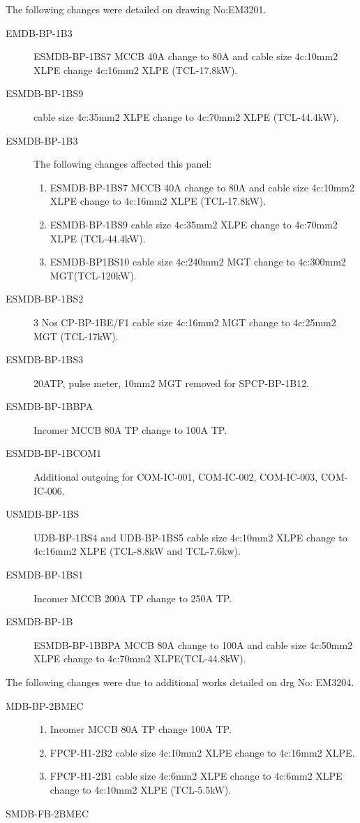 The following changes were detailed on drawing No:EM3201.

\begin{description}
\item[EMDB-BP-1B3] ESMDB-BP-1BS7 MCCB 40A change to 80A and cable size 4c:10mm2 XLPE change 4c:16mm2 XLPE (TCL-17.8kW).
\item[ESMDB-BP-1BS9] cable size 4c:35mm2 XLPE change to 4c:70mm2 XLPE (TCL-44.4kW).
\item[ESMDB-BP-1B3]  The following changes affected this panel:
     \begin{enumerate}
        \item ESMDB-BP-1BS7 MCCB 40A change to 80A and cable size 4c:10mm2 XLPE change to 4c:16mm2 XLPE    (TCL-17.8kW). 
        \item ESMDB-BP-1BS9 cable size 4c:35mm2 XLPE change to 4c:70mm2 XLPE (TCL-44.4kW). 
        \item ESMDB-BP1BS10 cable size 4c:240mm2 MGT change to 4c:300mm2 MGT(TCL-120kW).
     \end{enumerate}
\item[ESMDB-BP-1BS2]  3 Nos CP-BP-1BE/F1 cable size 4c:16mm2 MGT change to 4c:25mm2 MGT (TCL-17kW).
\item[ESMDB-BP-1BS3]  20ATP, pulse meter, 10mm2 MGT removed for SPCP-BP-1B12.
\item[ESMDB-BP-1BBPA] Incomer MCCB 80A TP change to 100A TP.
\item[ESMDB-BP-1BCOM1] Additional outgoing for COM-IC-001, COM-IC-002, COM-IC-003, COM-IC-006.
\item[USMDB-BP-1BS] UDB-BP-1BS4 and UDB-BP-1BS5 cable size 4c:10mm2 XLPE change to 4c:16mm2 XLPE (TCL-8.8kW and TCL-7.6kw).
\item[ESMDB-BP-1BS1] Incomer MCCB 200A TP change to 250A TP.
\item[ESMDB-BP-1B] ESMDB-BP-1BBPA MCCB 80A change to 100A and cable size 4c:50mm2 XLPE change to 4c:70mm2 XLPE(TCL-44.8kW).
\end{description}

The following changes were due to additional works detailed on drg No: EM3204.

\begin{description}
\item[MDB-BP-2BMEC]
   \begin{enumerate}
     \item Incomer MCCB 80A TP change 100A TP.
     \item FPCP-H1-2B2 cable size 4c:10mm2 XLPE change to 4c:16mm2 XLPE.
     \item FPCP-H1-2B1 cable size 4c:6mm2 XLPE change to 4c:6mm2 XLPE change to 4c:10mm2 XLPE (TCL-5.5kW).
   \end{enumerate}
\item[SMDB-FB-2BMEC]
\end{description}

